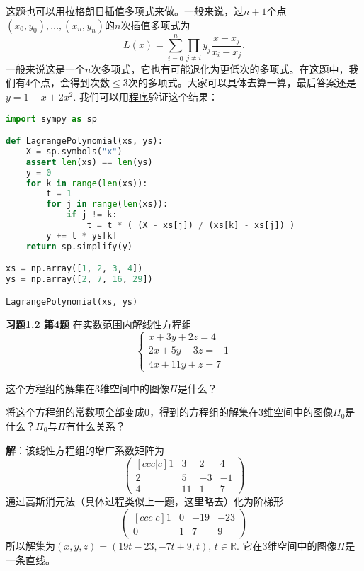 这题也可以用拉格朗日插值多项式来做。一般来说，过$n+1$个点$(x_0, y_0), \ldots, (x_n, y_n)$的$n$次插值多项式为
$$L(x) = \sum\limits_{i=0}^n \prod\limits_{j \neq i} y_j \dfrac{x-x_j}{x_i-x_j}.$$
一般来说这是一个$n$次多项式，它也有可能退化为更低次的多项式。在这题中，我们有4个点，会得到次数$\leqslant 3$次的多项式。大家可以具体去算一算，最后答案还是$y = 1 - x + 2x^2$. 我们可以用\href{https://github.com/wenh06/buaa-advanced-algebra-2021/blob/master/notebooks/class-1.ipynb}{程序}验证这个结果：
\begin{center}
\begin{lstlisting}[language=Python]
import sympy as sp

def LagrangePolynomial(xs, ys):
    X = sp.symbols("x")
    assert len(xs) == len(ys)
    y = 0
    for k in range(len(xs)):
        t = 1
        for j in range(len(xs)):
            if j != k:
                t = t * ( (X - xs[j]) / (xs[k] - xs[j]) )
        y += t * ys[k]
    return sp.simplify(y)

xs = np.array([1, 2, 3, 4])
ys = np.array([2, 7, 16, 29])

LagrangePolynomial(xs, ys)
\end{lstlisting}
\end{center}

\newpageorvspace

{\bf 习题1.2 第4题} 在实数范围内解线性方程组
$$\begin{cases}
x + 3y + 2z = 4 \\
2x + 5y -3z = -1 \\
4x + 11y + z = 7
\end{cases}$$

这个方程组的解集在3维空间中的图像$\Pi$是什么？

将这个方程组的常数项全部变成0，得到的方程组的解集在3维空间中的图像$\Pi_0$是什么？$\Pi_0$与$\Pi$有什么关系？

\newpageorvspace

{\bf 解}：该线性方程组的增广系数矩阵为
$$\begin{pmatrix}[ccc|c]
  1 & 3 & 2 & 4\\
  2 & 5 & -3 & -1 \\
  4 & 11 & 1 & 7
\end{pmatrix}$$
通过高斯消元法（具体过程类似上一题，这里略去）化为阶梯形
$$\begin{pmatrix}[ccc|c]
  1 & 0 & -19 & -23\\
  0 & 1 & 7 & 9
\end{pmatrix}$$
所以解集为$(x,y,z) = (19t-23,-7t+9,t)$, $t\in\mathbb{R}$. 它在3维空间中的图像$\Pi$是一条直线。


